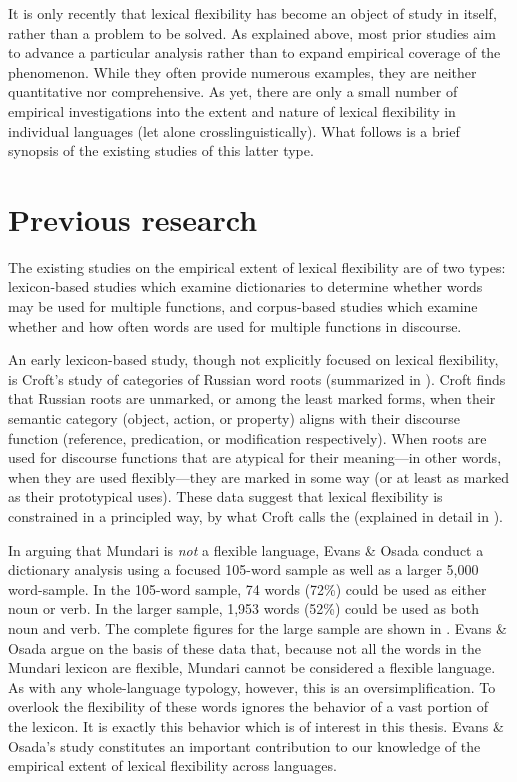 It is only recently that lexical flexibility has become an object of study in itself, rather than a problem to be solved. As explained above, most prior studies aim to advance a particular analysis rather than to expand empirical coverage of the phenomenon. While they often provide numerous examples, they are neither quantitative nor comprehensive. As yet, there are only a small number of empirical investigations into the extent and nature of lexical flexibility in individual languages (let alone crosslinguistically). What follows is a brief synopsis of the existing studies of this latter type.

\section{Previous research}

The existing studies on the empirical extent of lexical flexibility are of two types: lexicon-based studies which examine dictionaries to determine whether words may be used for multiple functions, and corpus-based studies which examine whether and how often words are used for multiple functions in discourse.

An early lexicon-based study, though not explicitly focused on lexical flexibility, is Croft's  study of categories of Russian word roots (summarized in ). Croft finds that Russian roots are unmarked, or among the least marked forms, when their semantic category (object, action, or property) aligns with their discourse function (reference, predication, or modification respectively). When roots are used for discourse functions that are atypical for their meaning—in other words, when they are used flexibly—they are marked in some way (or at least as marked as their prototypical uses). These data suggest that lexical flexibility is constrained in a principled way, by what Croft calls the  (explained in detail in ).

In arguing that Mundari is \emph{not} a flexible language, Evans \& Osada  conduct a dictionary analysis using a focused 105-word sample as well as a larger 5,000 word-sample. In the 105-word sample, 74 words (72\%) could be used as either noun or verb. In the larger sample, 1,953 words (52\%) could be used as both noun and verb. The complete figures for the large sample are shown in . Evans \& Osada argue on the basis of these data that, because not all the words in the Mundari lexicon are flexible, Mundari cannot be considered a flexible language. As with any whole-language typology, however, this is an oversimplification. To overlook the flexibility of these words ignores the behavior of a vast portion of the lexicon. It is exactly this behavior which is of interest in this thesis. Evans \& Osada's study constitutes an important contribution to our knowledge of the empirical extent of lexical flexibility across languages.

